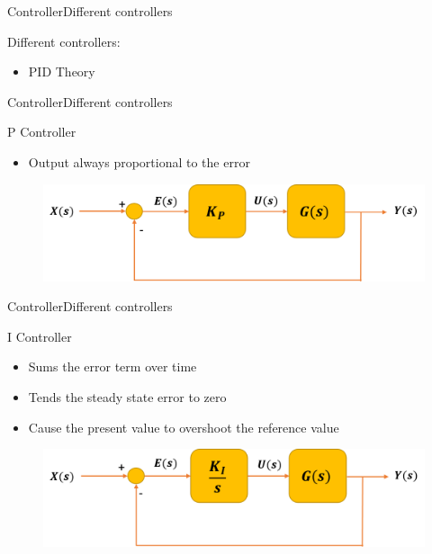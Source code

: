 \begin{frame}{Controller}{Different controllers}
  \begin{block}{Different controllers:}

	  \begin{itemize}
	  	\item PID Theory
	  \end{itemize}


  
  \end{block}
\end{frame}

\begin{frame}{Controller}{Different controllers}
  \begin{block}{P Controller}

	  \begin{itemize}
	  	\item Output always proportional to the error
	  \end{itemize}

	  \begin{figure}
        \includegraphics[scale=0.26]{../report/figures/propor_controller.png}
      \end{figure}
  
  \end{block}
\end{frame}

\begin{frame}{Controller}{Different controllers}
  \begin{block}{I Controller}

	  \begin{itemize}
	  	\item Sums the error term over time
	  	\item Tends the steady state error to zero
	  	\item Cause the present value to overshoot the reference value
	  \end{itemize}

	  \begin{figure}
        \includegraphics[scale=0.26]{../report/figures/integ_controller.png}
      \end{figure}
  
  \end{block}
\end{frame}


